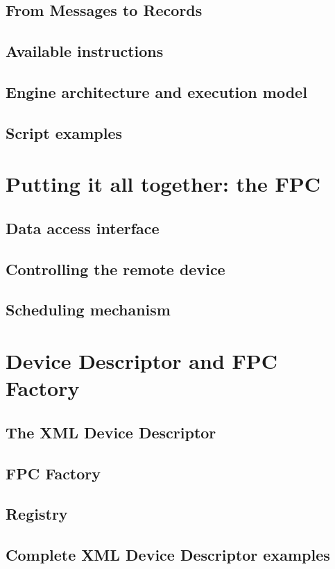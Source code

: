 \subsection{From Messages to Records}

\subsection{Available instructions}

\subsection{Engine architecture and execution model}

\subsection{Script examples}


\section{Putting it all together: the FPC}

\subsection{Data access interface}

\subsection{Controlling the remote device}

\subsection{Scheduling mechanism}


\section{Device Descriptor and FPC Factory}

\subsection{The XML Device Descriptor}

\subsection{FPC Factory}

\subsection{Registry}

\subsection{Complete XML Device Descriptor examples}